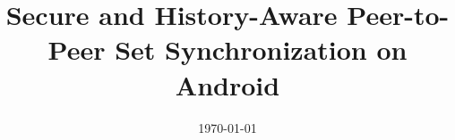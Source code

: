 \documentclass[a4paper, 10pt, oneside]{memoir}
\title				{Secure and History-Aware Peer-to-Peer Set 		Synchronization on Android}
\date				{\today}
\begin{document}

\thesisfront
\maketitle
\pagestyle{thesis}


\thesistoc
\thesismain




%
%
%
\thesisappendix
\thesisbib
\begin{appendices}
	 
\end{appendices}
\thesisback

\end{document}

